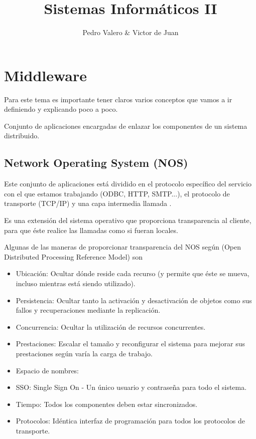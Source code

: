 \documentclass{apuntes}[nochap]
\author{Pedro Valero & Victor de Juan}
\title{Sistemas Informáticos II}
\begin{document}
\maketitle
\newpage
\tableofcontents


\chapter{Middleware}
Para este tema es importante tener claros varios conceptos que vamos a ir definiendo y explicando poco a poco.

\begin{defn}[Middleware]
Conjunto de aplicaciones encargadas de enlazar los componentes de un sistema distribuido.
\end{defn}

\section{Network Operating System (NOS)}
Este conjunto de aplicaciones está dividido en el protocolo específico del servicio con el que estamos trabajando (ODBC, HTTP, SMTP...), el protocolo de transporte (TCP/IP) y una capa intermedia llamada .

\begin{defn}
Es una extensión del sistema operativo que proporciona transparencia al cliente, para que éste realice las llamadas como si fueran locales.
\end{defn}

Algunas de las maneras de proporcionar transparencia del NOS según  (Open Distributed
Processing Reference Model) son
\begin{itemize}
\item Ubicación: Ocultar dónde reside cada recurso (y permite que éste se mueva, incluso mientras está siendo utilizado).
\item Persistencia: Ocultar tanto la activación y desactivación de objetos como sus fallos y recuperaciones mediante la replicación.
\item Concurrencia: Ocultar la utilización de recursos concurrentes.
\item Prestaciones: Escalar el tamaño y reconfigurar el sistema para mejorar sus prestaciones según varía la carga de trabajo.
\item Espacio de nombres:
\item SSO: Single Sign On - Un único usuario y contraseña para todo el sistema.
\item Tiempo: Todos los componentes deben estar sincronizados.
\item Protocolos: Idéntica interfaz de programación para todos los protocolos de transporte.
\end{itemize}
\end{document}
